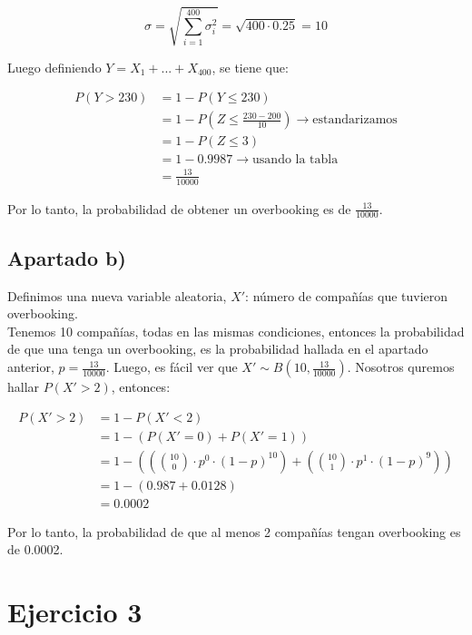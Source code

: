 \documentclass[11pt]{article}
\begin{document}
\begin{equation*}
    \sigma = \sqrt{\displaystyle\sum_{i=1}^{400} \sigma_i^2} = \sqrt{400 \cdot 0.25} = 10
\end{equation*}

Luego definiendo $Y = X_1 + ... + X_{400}$, se tiene que:

\begin{align*}
    P(Y > 230) & = 1 - P(Y \leq 230) \\
               & = 1 - P(Z \leq \frac{230 - 200}{10}) \rightarrow \text{estandarizamos} \\
               & = 1 - P(Z \leq 3) \\
               & = 1 - 0.9987 \rightarrow \text{usando la tabla} \\
               & = \frac{13}{10000}
\end{align*}

Por lo tanto, la probabilidad de obtener un overbooking es de $\frac{13}{10000}$.

\subsection*{Apartado b)}

Definimos una nueva variable aleatoria, $X'$: número de compañías que tuvieron overbooking. \\

Tenemos 10 compañías, todas en las mismas condiciones, entonces la probabilidad de que una
tenga un overbooking, es la probabilidad hallada en el apartado anterior, $p = \frac{13}{10000}$.
Luego, es fácil ver que $X' \sim B(10, \frac{13}{10000})$. Nosotros quremos hallar $P(X' > 2)$, entonces:

\begin{align*}
    P(X' > 2) & = 1 - P(X' < 2) \\
              & = 1 - (P(X' = 0) + P(X' = 1)) \\
              & = 1 - \left(\left(\binom{10}{0} \cdot p^0 \cdot (1-p)^{10}\right) + \left(\binom{10}{1} \cdot p^1 \cdot (1-p)^9\right)\right) \\
              & = 1 - (0.987 + 0.0128) \\
              & = 0.0002
\end{align*}

Por lo tanto, la probabilidad de que al menos 2 compañías tengan overbooking es de 
0.0002.

\section*{Ejercicio 3}
\end{document}
